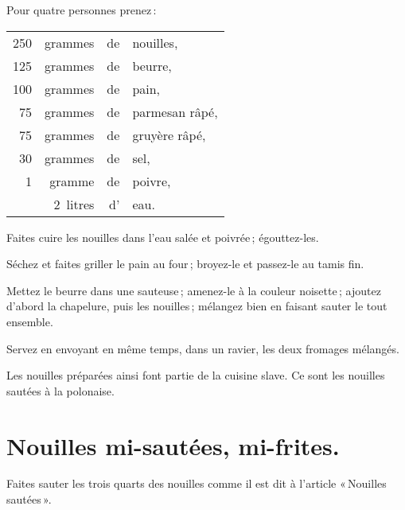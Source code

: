 Pour quatre personnes prenez :

\footnotesize
\begin{longtable}{rrrp{16em}}
    250 & grammes  & de & nouilles,                                                                       \\
    125 & grammes  & de & beurre,                                                                         \\
    100 & grammes  & de & pain,                                                                           \\
     75 & grammes  & de & parmesan râpé,                                                                  \\
     75 & grammes  & de & gruyère râpé,                                                                   \\
     30 & grammes  & de & sel,                                                                            \\
      1 & gramme   & de & poivre,                                                                         \\
        & 2 litres & d' & eau.                                                                            \\
\end{longtable}
\normalsize

Faites cuire les nouilles dans l'eau salée et poivrée ; égouttez-les.

Séchez et faites griller le pain au four ; broyez-le et passez-le au tamis fin.

Mettez le beurre dans une sauteuse ; amenez-le à la couleur noisette ; ajoutez
d'abord la chapelure, puis les nouilles ; mélangez bien en faisant sauter le
tout ensemble.

Servez en envoyant en même temps, dans un ravier, les deux fromages mélangés.

Les nouilles préparées ainsi font partie de la cuisine slave. Ce sont les
nouilles sautées à la polonaise.

\section*{\centering Nouilles mi-sautées, mi-frites.}
{}

Faites sauter les trois quarts des nouilles comme il est dit à l'article
« Nouilles sautées ».

